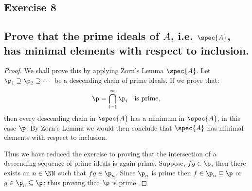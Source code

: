 \subsection*{Exercise 8}
\subsection*{%
Prove that the prime ideals of $A$, i.e. $\spec{A}$, has minimal elements with respect
to inclusion.
} 

\begin{proof}%
We shall prove this by applying Zorn's Lemma $\spec{A}$. Let $\p_1\supseteq\p_2\supseteq\cdots$
be a descending chain of prime ideals. If we prove that:
\[
	\p=\bigcap_{i=1}^{\infty}\p_i \quad\text{is prime},
\]
then every descending chain in $\spec{A}$ has a minimum in $\spec{A}$, in this case $\p$.
By Zorn's Lemma we would then conclude that $\spec{A}$ has minimal elements with respect
to inclusion.

Thus we have reduced the exercise to proving that the intersection of a descending
sequence of prime ideals is again prime. Suppose, $fg\in \p$, then there exists an $n\in\NN$
such that $fg\in\p_n$. Since $\p_n$ is prime then $f\in\p_n\subseteq\p$ or
$g\in\p_n\subseteq\p$; thus proving that $\p$ is prime.


%
\end{proof}%

